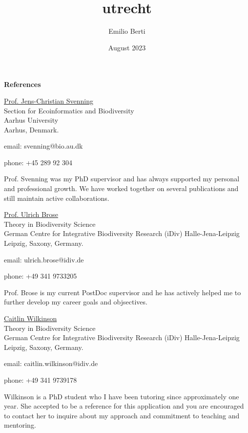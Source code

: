 \documentclass{letter}
\title{utrecht}
\author{Emilio Berti}
\date{August 2023}
\begin{document}
\textbf{References}

\underline{Prof. Jens-Christian Svenning}\\
Section for Ecoinformatics and Biodiversity\\
Aarhus University\\
Aarhus, Denmark.

email: svenning@bio.au.dk

phone: +45 289 92 304

Prof. Svenning was my PhD supervisor and has always supported my personal and professional growth.
We have worked together on several publications and still maintain active collaborations.

\vspace{1cm}

\underline{Prof. Ulrich Brose}\\
Theory in Biodiversity Science\\
German Centre for Integrative Biodiversity Research (iDiv) Halle-Jena-Leipzig\\
Leipzig, Saxony, Germany.

email: ulrich.brose@idiv.de

phone: +49 341 9733205

Prof. Brose is my current PostDoc supervisor and he has actively helped me to further develop my career goals and objsectives.

\vspace{1cm}

\underline{Caitlin Wilkinson}\\
Theory in Biodiversity Science\\
German Centre for Integrative Biodiversity Research (iDiv) Halle-Jena-Leipzig\\
Leipzig, Saxony, Germany.

email: caitlin.wilkinson@idiv.de

phone: +49 341 9739178

Wilkinson is a PhD student who I have been tutoring since approximately one year.
She accepted to be a reference for this application and you are encouraged to contact her to inquire about my approach and commitment to teaching and mentoring.
\end{document}
